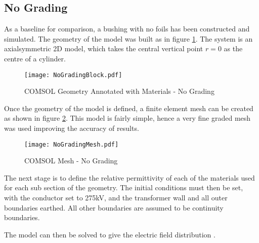 \subsection{No Grading}
As a baseline for comparison, a bushing with no foils has been constructed and simulated.
The geometry of the model was built as in figure \ref{figure:Geom:Nograde}.
The system is an axialsymmetric 2D model, which takes the central vertical point $r=0$ as the centre of a cylinder.
\begin{figure}[!h]
   \centering
   \texttt{[image: NoGradingBlock.pdf]}
   \caption{COMSOL Geometry Annotated with Materials - No Grading}
   \label{figure:Geom:Nograde}
\end{figure}

Once the geometry of the model is defined, a finite element mesh can be created as shown in figure \ref{figure:Mesh:Nograde}.
This model is fairly simple, hence a very fine graded mesh was used improving the accuracy of results.
\begin{figure}[!h]
   \centering
   \texttt{[image: NoGradingMesh.pdf]}
   \caption{COMSOL Mesh - No Grading}
   \label{figure:Mesh:Nograde}
\end{figure}

The next stage is to define the relative permittivity of each of the materials used for each sub section of the geometry.
The initial conditions must then be set, with the conductor set to 275kV, and the transformer wall and all outer boundaries earthed.
All other boundaries are assumed to be continuity boundaries.

The model can then be solved to give the electric field distribution
.
%
%
%
%
%
